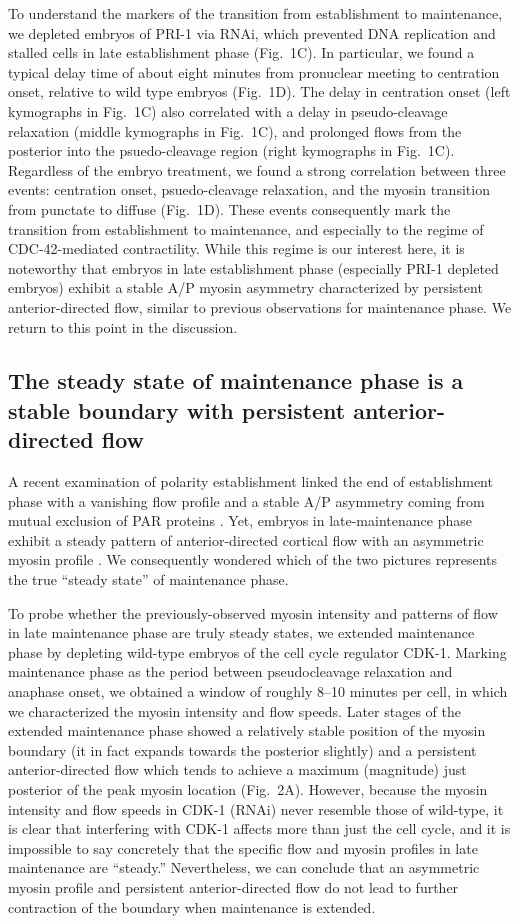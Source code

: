 \documentclass[11pt]{article}
\newcommand{\6}[1]{#1_{\text{6}}}
\newcommand{\3}[1]{#1_{\text{3}}}
\begin{document}
To understand the markers of the transition from establishment to maintenance, we depleted embryos of PRI-1 via RNAi, which prevented DNA replication and stalled cells in late establishment phase (Fig.\ 1C). In particular, we found a typical delay time of about eight minutes from pronuclear meeting to centration onset, relative to wild type embryos (Fig.\ 1D). The delay in centration onset (left kymographs in Fig.\ 1C) also correlated with a delay in pseudo-cleavage relaxation (middle kymographs in Fig.\ 1C), and prolonged flows from the posterior into the psuedo-cleavage region (right kymographs in Fig.\ 1C). Regardless of the embryo treatment, we found a strong correlation between three events: centration onset, psuedo-cleavage relaxation, and the myosin transition from punctate to diffuse (Fig.\ 1D). These events consequently mark the transition from establishment to maintenance, and especially to the regime of CDC-42-mediated contractility. While this regime is our interest here, it is noteworthy that embryos in late establishment phase (especially PRI-1 depleted embryos) exhibit a stable A/P myosin asymmetry characterized by persistent anterior-directed flow, similar to previous observations for maintenance phase. We return to this point in the discussion.


\subsection*{The steady state of maintenance phase is a stable boundary with persistent anterior-directed flow}
A recent examination of polarity establishment linked the end of establishment phase with a vanishing flow profile and a stable A/P asymmetry coming from mutual exclusion of PAR proteins \citep{gross2019guiding}. Yet, embryos in late-maintenance phase exhibit a steady pattern of anterior-directed cortical flow with an asymmetric myosin profile \citep[Fig.~2]{sailer2015dynamic}. We consequently wondered which of the two pictures represents the true ``steady state'' of maintenance phase.  

To probe whether the previously-observed myosin intensity and patterns of flow in late maintenance phase are truly steady states, we extended maintenance phase by depleting wild-type embryos of the cell cycle regulator CDK-1. Marking maintenance phase as the period between pseudocleavage relaxation and anaphase onset, we obtained a window of roughly 8--10 minutes per cell, in which we characterized the myosin intensity and flow speeds. Later stages of the extended maintenance phase showed a relatively stable position of the myosin boundary (it in fact expands towards the posterior slightly) and a persistent anterior-directed flow which tends to achieve a maximum (magnitude) just posterior of the peak myosin location (Fig.\ 2A). However, because the myosin intensity and flow speeds in CDK-1 (RNAi) never resemble those of wild-type, it is clear that interfering with CDK-1 affects more than just the cell cycle, and it is impossible to say concretely that the specific flow and myosin profiles in late maintenance are ``steady.'' Nevertheless, we can conclude that an asymmetric myosin profile and persistent anterior-directed flow do not lead to further contraction of the boundary when maintenance is extended.
\end{document}
